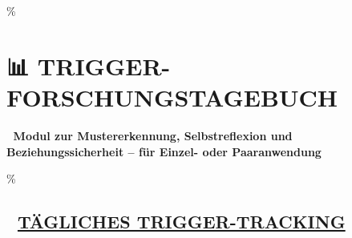 \hypertarget{trigger-forschungstagebuch}{\%
\section{\texorpdfstring{📊 \textbf{TRIGGER-FORSCHUNGSTAGEBUCH} }{📊 TRIGGER-FORSCHUNGSTAGEBUCH }}\label{trigger-forschungstagebuch}}

🧩 \textbf{Modul zur Mustererkennung, Selbstreflexion und Beziehungssicherheit -- für Einzel- oder Paaranwendung}

\hypertarget{tuxe4gliches-trigger-tracking}{\%
\subsection{\texorpdfstring{📆 \textbf{\ul{TÄGLICHES TRIGGER-TRACKING}}}{📆 TÄGLICHES TRIGGER-TRACKING}}\label{tuxe4gliches-trigger-tracking}}

